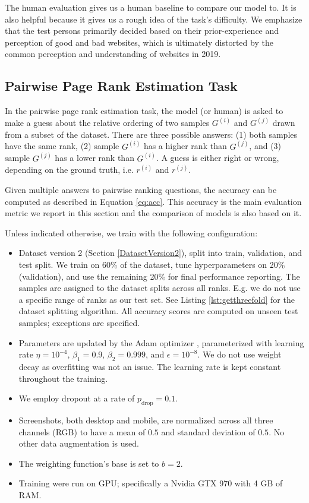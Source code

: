 The human evaluation gives us a human baseline to compare our model to. It is also helpful because it gives us a rough idea of the task's difficulty. We emphasize that the test persons primarily decided based on their prior-experience and perception of good and bad websites, which is ultimately distorted by the common perception and understanding of websites in 2019.

\subsection{Pairwise Page Rank Estimation Task}

In the pairwise page rank estimation task, the model (or human) is asked to make a guess about the relative ordering of two samples $G^{(i)}$ and $G^{(j)}$ drawn from a subset of the dataset. There are three possible answers: (1) both samples have the same rank, (2) sample $G^{(i)}$ has a higher rank than $G^{(j)}$, and (3) sample $G^{(j)}$ has a lower rank than $G^{(i)}$. A guess is either right or wrong, depending on the ground truth, i.e. $r^{(i)}$ and $r^{(j)}$.

Given multiple answers to pairwise ranking questions, the accuracy can be computed as described in Equation \ref{eq:acc}. This accuracy is the main evaluation metric we report in this section and the comparison of models is also based on it.

Unless indicated otherwise, we train with the following configuration:
\begin{itemize}
    \item Dataset version 2 (Section \ref{DatasetVersion2}), split into train, validation, and test split. We train on 60\% of the dataset, tune hyperparameters on 20\% (validation), and use the remaining 20\% for final performance reporting. The samples are assigned to the dataset splits across all ranks. E.g. we do not use a specific range of ranks as our test set. See Listing \ref{lst:getthreefold} for the dataset splitting algorithm. All accuracy scores are computed on unseen test samples; exceptions are specified.
    \item Parameters are updated by the Adam optimizer \cite{kingma2014:adam}, parameterized with learning rate $\eta=10^{-4}$, $\beta_1=0.9$, $\beta_2=0.999$, and $\epsilon=10^{-8}$. We do not use weight decay as overfitting was not an issue. The learning rate is kept constant throughout the training.
    \item We employ dropout \cite{srivastava2014:dropout} at a rate of $p_\text{drop}=0.1$.
    \item Screenshots, both desktop and mobile, are normalized across all three channels (RGB) to have a mean of $0.5$ and standard deviation of $0.5$. No other data augmentation is used.
    \item The weighting function's base is set to $b=2$.
    \item Training were run on GPU; specifically a Nvidia GTX 970 with 4 GB of RAM.
\end{itemize}

